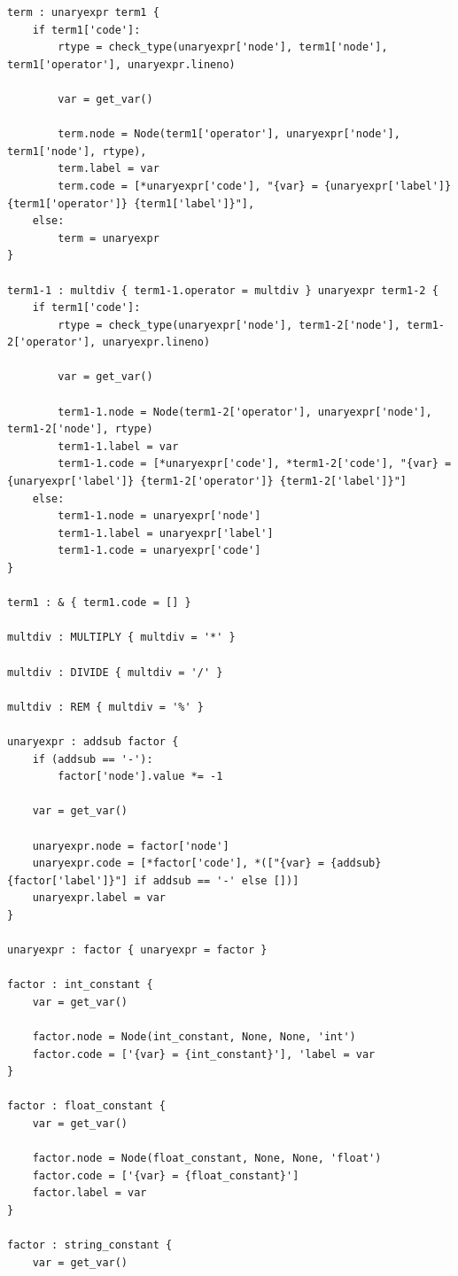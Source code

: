 \documentclass[
	12pt,				%
	openright,			%
	twoside,			%
	a4paper,			%
	english,			%
	french,				%
	spanish,			%
	brazil				%
	]{abntex2}
\begin{document}
\begin{apendicesenv}
\begin{lstlisting}
term : unaryexpr term1 {
    if term1['code']:
        rtype = check_type(unaryexpr['node'], term1['node'], term1['operator'], unaryexpr.lineno)

        var = get_var()

        term.node = Node(term1['operator'], unaryexpr['node'], term1['node'], rtype),
        term.label = var
        term.code = [*unaryexpr['code'], "{var} = {unaryexpr['label']} {term1['operator']} {term1['label']}"],
    else:
        term = unaryexpr
}

term1-1 : multdiv { term1-1.operator = multdiv } unaryexpr term1-2 {
    if term1['code']:
        rtype = check_type(unaryexpr['node'], term1-2['node'], term1-2['operator'], unaryexpr.lineno)

        var = get_var()

        term1-1.node = Node(term1-2['operator'], unaryexpr['node'], term1-2['node'], rtype)
        term1-1.label = var
        term1-1.code = [*unaryexpr['code'], *term1-2['code'], "{var} = {unaryexpr['label']} {term1-2['operator']} {term1-2['label']}"]
    else:
        term1-1.node = unaryexpr['node']
        term1-1.label = unaryexpr['label']
        term1-1.code = unaryexpr['code']
}

term1 : & { term1.code = [] }

multdiv : MULTIPLY { multdiv = '*' }

multdiv : DIVIDE { multdiv = '/' }

multdiv : REM { multdiv = '%' }

unaryexpr : addsub factor {
    if (addsub == '-'):
        factor['node'].value *= -1

    var = get_var()

    unaryexpr.node = factor['node']
    unaryexpr.code = [*factor['code'], *(["{var} = {addsub}{factor['label']}"] if addsub == '-' else [])]
    unaryexpr.label = var
}

unaryexpr : factor { unaryexpr = factor }

factor : int_constant {
    var = get_var()

    factor.node = Node(int_constant, None, None, 'int')
    factor.code = ['{var} = {int_constant}'], 'label = var
}

factor : float_constant {
    var = get_var()

    factor.node = Node(float_constant, None, None, 'float')
    factor.code = ['{var} = {float_constant}']
    factor.label = var
}

factor : string_constant {
    var = get_var()


\end{lstlisting}
\end{apendicesenv}
\end{document}
